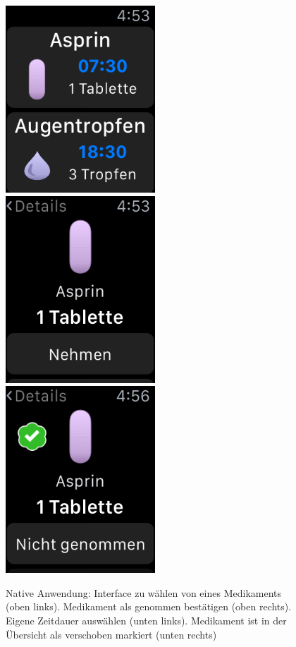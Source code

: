\begin{figure}
	\caption{Native Anwendung: Interface zu wählen von eines Medikaments (oben links). Medikament als genommen bestätigen (oben rechts). Eigene Zeitdauer auswählen (unten links). Medikament ist in der Übersicht als verschoben markiert (unten rechts)}
	\label{fig:watch-app-take}
	\includegraphics[width=0.5\textwidth]{04_realisation/screenshots/watch/notTaken01.png}
	\includegraphics[width=0.5\textwidth]{04_realisation/screenshots/watch/notTaken02.png}
	\includegraphics[width=0.5\textwidth]{04_realisation/screenshots/watch/taken01.png}

\end{figure}

